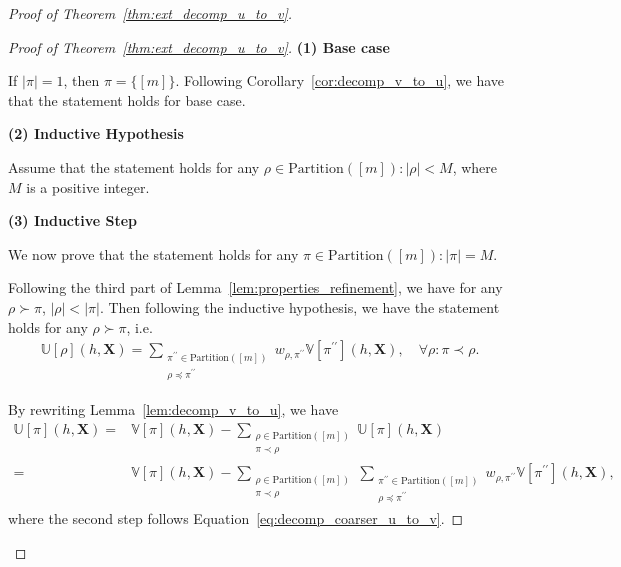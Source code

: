 \documentclass[letterpaper,11pt]{article}
\newcommand{\ustat}{\mathbb{U}}
\newcommand{\vstat}{\mathbb{V}}
\newcommand{\partition}{\mathrm{Partition}}
\newcommand{\partitionp}[1]{\partition(#1)}
\newcommand{\pleq}{\preceq}
\newcommand{\pless}{\prec}
\newcommand{\pgreater}{\succ}
\begin{document}
\begin{proof}[Proof of Theorem~\ref{thm:ext_decomp_u_to_v}]
\begin{proof}[Proof of Theorem~\ref{thm:ext_decomp_u_to_v}]
    {\bf (1) Base case}
    
    If $|\pi| = 1$, then $\pi = \{[m]\}$. Following Corollary~\ref{cor:decomp_v_to_u}, we have that the statement holds for base case. 
    
    {\bf (2) Inductive Hypothesis}
    
    Assume that the statement holds for any $\rho \in \partitionp{[m]}: |\rho| < M$, where $M$ is a positive integer. 
    
    {\bf (3) Inductive Step}
    
    We now prove that the statement holds for any $\pi \in \partitionp{[m]}: |\pi| = M$. 
    
    Following the third part of Lemma~\ref{lem:properties_refinement}, we have for any $\rho \pgreater \pi$, $|\rho| < |\pi|$. Then following the inductive hypothesis, we have the statement holds for any $\rho \pgreater \pi$, i.e.
    \begin{align}\label{eq:decomp_coarser_u_to_v}
        \ustat[\rho](h,\bm{X}) 
        = \sum_{\substack{ \pi^{\prime\prime} \in \partitionp{[m]} \\ \rho \pleq \pi^{\prime\prime}}}  
        w_{\rho, \pi^{\prime\prime}}  \vstat[\pi^{\prime\prime}](h, \bm{X}), \quad \forall \rho: \pi \pless \rho. 
    \end{align}

    By rewriting Lemma~\ref{lem:decomp_v_to_u}, we have
    \begin{align*}
        \ustat[\pi](h,\bm{X}) =& \vstat[\pi]( h, \bm{X}) 
        - \sum_{\substack{ \rho \in \partitionp{[m]} \\ \pi \pless \rho}} \ustat[\pi](h, \bm{X}) \\
        =& \vstat[\pi]( h, \bm{X}) 
        - \sum_{\substack{ \rho \in \partitionp{[m]} \\ \pi \pless \rho}} \sum_{\substack{ \pi^{\prime\prime} \in \partitionp{[m]} \\ \rho \pleq \pi^{\prime\prime}}}  
        w_{\rho, \pi^{\prime\prime}}  \vstat[\pi^{\prime\prime}](h, \bm{X}), 
    \end{align*}
    where the second step follows Equation~\ref{eq:decomp_coarser_u_to_v}. 
    

\end{proof}
\end{proof}
\end{document}
